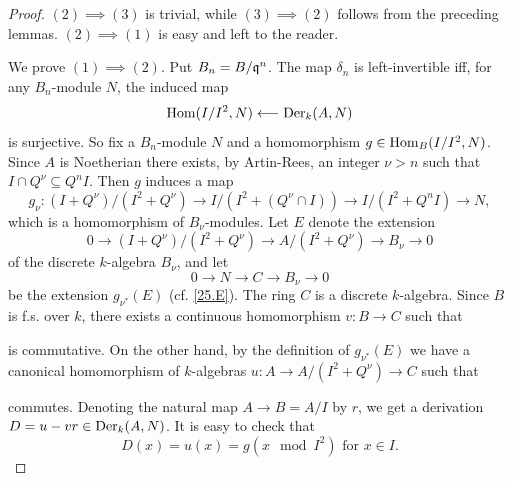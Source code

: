 \documentclass[../main]{subfiles}
\begin{document}
\begin{proof}
$(2) \implies (3)$ is trivial, while $(3) \implies (2)$ follows from the preceding lemmas. $(2) \implies (1)$ is easy and left to the reader. 

We prove $(1) \implies (2)$. Put $B_n = B/{\mathfrak{q}}^n$. The map $\delta_n$ is left-invertible iff, for any $B_n$-module $N$, the induced map \[\operatorname{Hom}(I/I^2, N) \longleftarrow \operatorname{Der}_k(A, N)\] is surjective. So fix a $B_n$-module $N$ and a homomorphism $g \in \operatorname{Hom}_B(I/I^2, N)$. Since $A$ is Noetherian there exists, by Artin-Rees, an integer $\nu > n$ such that $I \cap Q^\nu \subseteq Q^n I$. Then $g$ induces a map \[g_\nu : (I + Q^\nu)/(I^2 + Q^\nu) \longrightarrow I/(I^2 + (Q^\nu \cap I)) \longrightarrow I/(I^2 + Q^n I) \longrightarrow N,\] which is a homomorphism of $B_\nu$-modules. Let $E$ denote the extension
\[
0 \longrightarrow (I + Q^\nu)/(I^2 + Q^\nu) \longrightarrow A/(I^2 + Q^\nu) \longrightarrow B_\nu \longrightarrow 0
\]
of the discrete $k$-algebra $B_\nu$, and let
\[
0 \longrightarrow N \longrightarrow C \longrightarrow B_\nu \longrightarrow 0
\]
be the extension $g_{\nu^\ast}(E)$ (cf. \ref{25.E}). The ring $C$ is a discrete $k$-algebra. Since $B$ is f.s. over $k$, there exists a continuous homomorphism $v : B \longrightarrow C$ such that

\begin{center}
\end{center}

is commutative. On the other hand, by the definition of $g_{\nu^\ast}(E)$ we have a canonical homomorphism of $k$-algebras $u : A \longrightarrow A/(I^2 + Q^\nu) \longrightarrow C$ such that

\begin{center}
\end{center}

commutes. Denoting the natural map $A \longrightarrow B = A/I$ by $r$, we get a derivation $D = u - vr \in \operatorname{Der}_k(A, N)$. It is easy to check that \[D(x) = u(x) = g(x \mod I^2)\text{ for }x \in I.\] 
\end{proof}
\end{document}
